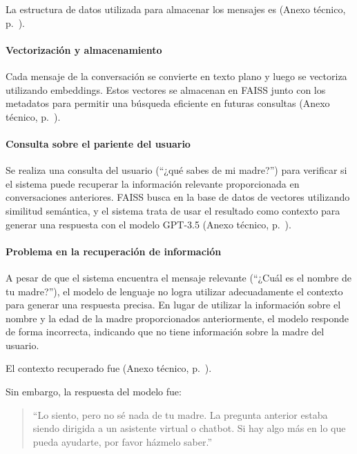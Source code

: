 La estructura de datos utilizada para almacenar los mensajes es (Anexo técnico, p.~\pageref{anexo:code-4-1-6-3}).

\paragraph{Vectorización y almacenamiento}

Cada mensaje de la conversación se convierte en texto plano y luego se vectoriza utilizando embeddings. Estos vectores se almacenan en FAISS junto con los metadatos para permitir una búsqueda eficiente en futuras consultas (Anexo técnico, p.~\pageref{anexo:code-4-1-6-4}).

\paragraph{Consulta sobre el pariente del usuario}

Se realiza una consulta del usuario (``¿qué sabes de mi madre?'') para verificar si el sistema puede recuperar la información relevante proporcionada en conversaciones anteriores. FAISS busca en la base de datos de vectores utilizando similitud semántica, y el sistema trata de usar el resultado como contexto para generar una respuesta con el modelo GPT-3.5 (Anexo técnico, p.~\pageref{anexo:code-4-1-6-5}).

\paragraph{Problema en la recuperación de información}

A pesar de que el sistema encuentra el mensaje relevante (``¿Cuál es el nombre de tu madre?''), el modelo de lenguaje no logra utilizar adecuadamente el contexto para generar una respuesta precisa. En lugar de utilizar la información sobre el nombre y la edad de la madre proporcionados anteriormente, el modelo responde de forma incorrecta, indicando que no tiene información sobre la madre del usuario.

El contexto recuperado fue (Anexo técnico, p.~\pageref{anexo:code-4-1-6-6}).

Sin embargo, la respuesta del modelo fue:
\begin{quote}
``Lo siento, pero no sé nada de tu madre. La pregunta anterior estaba siendo dirigida a un asistente virtual o chatbot. Si hay algo más en lo que pueda ayudarte, por favor házmelo saber.''
\end{quote}

